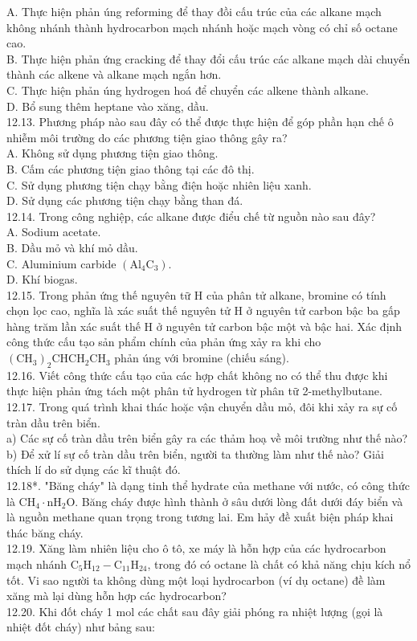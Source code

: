 \documentclass[10pt]{article}
\begin{document}
A. Thực hiện phản úng reforming để thay đồi cấu trúc của các alkane mạch không nhánh thành hydrocarbon mạch nhánh hoặc mạch vòng có chỉ số octane cao.\\
B. Thực hiện phản ứng cracking để thay đổi cấu trúc các alkane mạch dài chuyển thành các alkene và alkane mạch ngắn hơn.\\
C. Thực hiện phản úng hydrogen hoá để chuyển các alkene thành alkane.\\
D. Bổ sung thêm heptane vào xăng, dầu.\\
12.13. Phương pháp nào sau đây có thể được thực hiện để góp phần hạn chế ô nhiễm môi trường do các phương tiện giao thông gây ra?\\
A. Không sử dụng phương tiện giao thông.\\
B. Cấm các phương tiện giao thông tại các đô thị.\\
C. Sử dụng phương tiện chạy bằng điện hoặc nhiên liệu xanh.\\
D. Sử dụng các phương tiện chạy bằng than đá.\\
12.14. Trong công nghiệp, các alkane được điểu chế từ nguồn nào sau đây?\\
A. Sodium acetate.\\
B. Dầu mỏ và khí mỏ dầu.\\
C. Aluminium carbide $\left(\mathrm{Al}_{4} \mathrm{C}_{3}\right)$.\\
D. Khí biogas.\\
12.15. Trong phản ứng thế nguyên tữ H của phân tử alkane, bromine có tính chọn lọc cao, nghĩa là xác suất thế nguyên tử H ở nguyên tử carbon bậc ba gấp hàng trăm lần xác suất thế H ở nguyên tử carbon bậc một và bậc hai. Xác định công thức cấu tạo sản phẩm chính của phản ứng xảy ra khi cho $\left(\mathrm{CH}_{3}\right)_{2} \mathrm{CHCH}_{2} \mathrm{CH}_{3}$ phản úng với bromine (chiếu sáng).\\
12.16. Viết công thức cấu tạo của các hợp chất không no có thể thu được khi thực hiện phản ứng tách một phân tử hydrogen từ phân tữ 2-methylbutane.\\
12.17. Trong quá trình khai thác hoặc vận chuyển dầu mỏ, đôi khi xảy ra sự cố tràn dầu trên biển.\\
a) Các sự cố tràn dầu trên biển gây ra các thảm hoạ về môi trường như thế nào?\\
b) Để xử lí sự cố tràn dầu trên biển, người ta thường làm như thế nào? Giải thích lí do sử dụng các kĩ thuật đó.\\
12.18*. "Băng cháy" là dạng tinh thể hydrate của methane với nước, có công thức là $\mathrm{CH}_{4} \cdot \mathrm{nH}_{2} \mathrm{O}$. Băng cháy được hình thành ở sâu dưới lòng đất dưới đáy biển và là nguồn methane quan trọng trong tương lai. Em hảy đề xuất biện pháp khai thác băng cháy.\\
12.19. Xăng làm nhiên liệu cho ô tô, xe máy là hỗn hợp của các hydrocarbon mạch nhánh $\mathrm{C}_{5} \mathrm{H}_{12}-\mathrm{C}_{11} \mathrm{H}_{24}$, trong đó có octane là chất có khả năng chịu kích nổ tốt. Vi sao người ta không dùng một loại hydrocarbon (ví dụ octane) đề làm xăng mà lại dùng hỗn hợp các hydrocarbon?\\
12.20. Khi đốt cháy 1 mol các chất sau đây giải phóng ra nhiệt lượng (gọi là nhiệt đốt cháy) như bảng sau:
\end{document}
